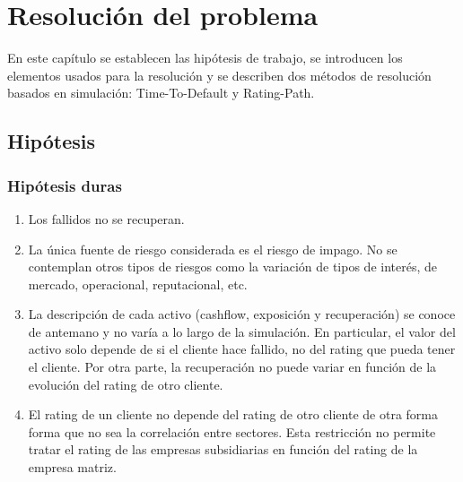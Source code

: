 
%
%
%
%
%
%
%
%

\chapter{Resoluci\'on del problema}
\label{sec:resolution}

En este cap\'itulo se establecen las hip\'otesis de trabajo, se introducen los
elementos usados para la resoluci\'on y se describen dos m\'etodos de
resoluci\'on basados en simulaci\'on: Time-To-Default y Rating-Path.


\section{Hip\'otesis}

\subsection{Hip\'otesis duras}
\begin{enumerate}
\item Los fallidos no se recuperan.
\item La \'unica fuente de riesgo considerada es el riesgo de impago. No se 
contemplan otros tipos de riesgos como la variaci\'on de tipos de inter\'es, 
de mercado, operacional, reputacional, etc.
\item La descripci\'on de cada activo (cashflow, exposici\'on y recuperaci\'on) 
se conoce de antemano y no var\'ia a lo largo de la simulaci\'on. En particular,
el valor del activo solo depende de si el cliente hace fallido, no del rating
que pueda tener el cliente. Por otra parte, la recuperaci\'on no puede variar en 
funci\'on de la evoluci\'on del rating de otro cliente.
\item El rating de un cliente no depende del rating de otro cliente de otra 
forma forma que no sea la correlaci\'on entre sectores. Esta restricci\'on no 
permite tratar el rating de las empresas subsidiarias en funci\'on del rating 
de la empresa matriz.
\end{enumerate}

